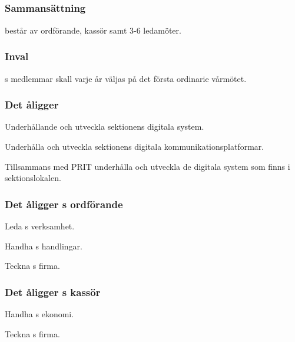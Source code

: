 \subsection{\DIGITFULL}
\subsubsection{Sammansättning}
\DIGIT{} består av ordförande, kassör samt 3-6 ledamöter.

\subsubsection{Inval}
\DIGIT{}s medlemmar skall varje år väljas på det första ordinarie vårmötet.

\subsubsection{Det åligger \DIGIT}
\begin{att}
	\item Underhållande och utveckla sektionens digitala system.
	\item Underhålla och utveckla sektionens digitala kommunikationsplatformar.
	\item Tillsammans med PRIT underhålla och utveckla de digitala system som finns i sektionslokalen.
\end{att}

\subsubsection{Det åligger \DIGIT{}s ordförande}
\begin{att}
	\item Leda \DIGIT{}s verksamhet.
	\item Handha \DIGIT{}s handlingar.
	\item Teckna \DIGIT{}s firma.
\end{att}

\subsubsection{Det åligger \DIGIT{}s kassör}
\begin{att}
	\item Handha \DIGIT{}s ekonomi.
	\item Teckna \DIGIT{}s firma.
\end{att}